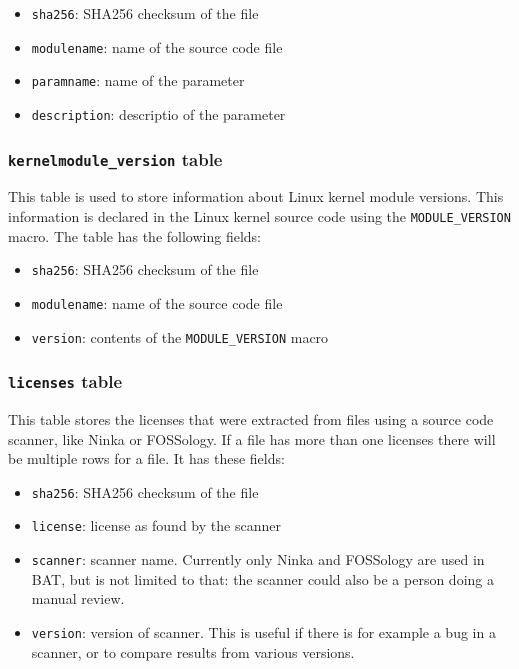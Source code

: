 \documentclass[10pt]{article}
\begin{document}
\begin{itemize}
\item \texttt{sha256}: SHA256 checksum of the file
\item \texttt{modulename}: name of the source code file
\item \texttt{paramname}: name of the parameter
\item \texttt{description}: descriptio of the parameter
\end{itemize}

\subsubsection{\texttt{kernelmodule\_version} table}

This table is used to store information about Linux kernel module versions.
This information is declared in the Linux kernel source code using the
\texttt{MODULE\_VERSION} macro. The table has the following fields:

\begin{itemize}
\item \texttt{sha256}: SHA256 checksum of the file
\item \texttt{modulename}: name of the source code file
\item \texttt{version}: contents of the \texttt{MODULE\_VERSION} macro
\end{itemize}

\subsubsection{\texttt{licenses} table}

This table stores the licenses that were extracted from files using a source
code scanner, like Ninka or FOSSology. If a file has more than one licenses
there will be multiple rows for a file. It has these fields:

\begin{itemize}
\item \texttt{sha256}: SHA256 checksum of the file
\item \texttt{license}: license as found by the scanner
\item \texttt{scanner}: scanner name. Currently only Ninka and FOSSology are
used in BAT, but is not limited to that: the scanner could also be a person
doing a manual review.
\item \texttt{version}: version of scanner. This is useful if there is for
example a bug in a scanner, or to compare results from various versions.
\end{itemize}
\end{document}

